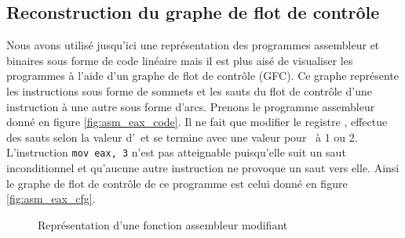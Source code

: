 \subsection{Reconstruction du graphe de flot de contrôle}
Nous avons utilisé jusqu'ici une représentation des programmes assembleur et binaires sous forme de code linéaire mais il est plus aisé de visualiser les programmes à l'aide d'un graphe de flot de contrôle (GFC).
Ce graphe représente les instructions sous forme de sommets et les sauts du flot de contrôle d'une instruction à une autre sous forme d'arcs.
Prenons le programme assembleur donné en figure \ref{fig:asm_eax_code}. Il ne fait que modifier le registre \eax, effectue des sauts selon la valeur d'\eax\ et se termine avec une valeur pour \eax\ à 1 ou 2. L'instruction \texttt{mov eax, 3} n'est pas atteignable puisqu'elle suit un saut inconditionnel et qu'aucune autre instruction ne provoque un saut vers elle.
Ainsi le graphe de flot de contrôle de ce programme est celui donné en figure \ref{fig:asm_eax_cfg}.


\begin{figure}[h]
\begin{center}
\end{center}
\caption{Représentation d'une fonction assembleur modifiant \eax}
\label{fig:asm_eax}
\end{figure}

